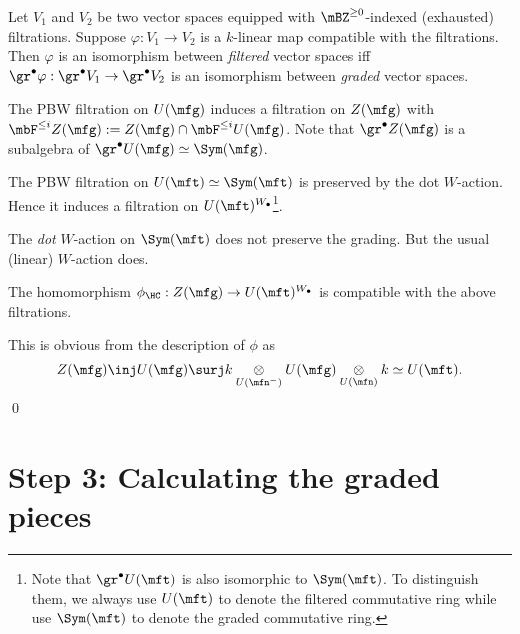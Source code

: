 	\begin{facts}
		Let $V_1$ and $V_2$ be two vector spaces equipped with $\mBZ^{\ge 0}$-indexed (exhausted) filtrations. Suppose $\varphi:V_1\to V_2$ is a $k$-linear map compatible with the filtrations. Then $\varphi$ is an isomorphism between \emph{filtered} vector spaces iff $\gr^\bullet \varphi: \gr^\bullet V_1 \to \gr^\bullet V_2$ is an isomorphism between \emph{graded} vector spaces.
	\end{facts}

	\begin{constr}
		The PBW filtration on $U(\mfg)$ induces a filtration on $Z(\mfg)$ with $\mbF^{\le i} Z(\mfg):= Z(\mfg)\cap \mbF^{\le i}U(\mfg)$. Note that $\gr^\bullet Z(\mfg)$ is a subalgebra of $\gr^\bullet U(\mfg) \simeq \Sym(\mfg)$.
	\end{constr}

	\begin{constr}
		The PBW filtration on $U(\mft)\simeq \Sym(\mft)$ is preserved by the dot $W$-action. Hence it induces a filtration on $U(\mft)^{W_\bullet}$\footnote{Note that $\gr^\bullet U(\mft)$ is also isomorphic to $\Sym(\mft)$. To distinguish them, we always use $U(\mft)$ to denote the filtered commutative ring while use $\Sym(\mft)$ to denote the graded commutative ring.}.
	\end{constr}

	\begin{warn}
		The \emph{dot} $W$-action on $\Sym(\mft)$ does not preserve the grading. But the usual (linear) $W$-action does.
	\end{warn}

	\begin{lem}
		The homomorphism $\phi_\HC: Z(\mfg) \to U(\mft)^{W_\bullet}$ is compatible with the above filtrations.
	\end{lem}

	\proof
		This is obvious from the description of $\phi$ as
		\[
			Z(\mfg) \inj U(\mfg) \surj k\ot_{U(\mfn^-)} U(\mfg) \ot_{U(\mfn)} k \simeq U(\mft).
		\]
	\qed

\section{Step 3: Calculating the graded pieces}
	
